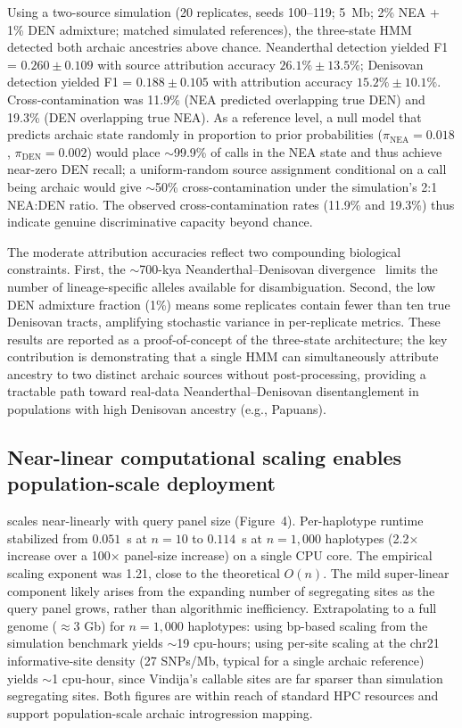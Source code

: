 Using a two-source simulation (20 replicates, seeds 100--119; 5~Mb;
2\% NEA + 1\% DEN admixture; matched simulated references),
the three-state \AP{} HMM detected both archaic ancestries above chance.
Neanderthal detection yielded F1 = $0.260 \pm 0.109$ with source attribution
accuracy $26.1\% \pm 13.5\%$; Denisovan detection yielded F1 = $0.188 \pm 0.105$
with attribution accuracy $15.2\% \pm 10.1\%$.
Cross-contamination was 11.9\% (NEA predicted overlapping true DEN)
and 19.3\% (DEN overlapping true NEA).
As a reference level, a null model that predicts archaic state randomly
in proportion to prior probabilities ($\pi_\mathrm{NEA} = 0.018$,
$\pi_\mathrm{DEN} = 0.002$) would place $\sim$99.9\% of calls in the NEA
state and thus achieve near-zero DEN recall; a uniform-random source
assignment conditional on a call being archaic would give $\sim$50\%
cross-contamination under the simulation's 2:1 NEA:DEN ratio.
The observed cross-contamination rates (11.9\% and 19.3\%) thus indicate
genuine discriminative capacity beyond chance.

The moderate attribution accuracies reflect two compounding biological constraints.
First, the $\sim$700-kya Neanderthal--Denisovan
divergence~\citep{prufer2014complete} limits the number of lineage-specific
alleles available for disambiguation.
Second, the low DEN admixture fraction (1\%) means some replicates contain
fewer than ten true Denisovan tracts, amplifying stochastic variance in per-replicate metrics.
These results are reported as a proof-of-concept of the three-state architecture;
the key contribution is demonstrating that a single HMM can simultaneously
attribute ancestry to two distinct archaic sources without post-processing,
providing a tractable path toward real-data Neanderthal--Denisovan disentanglement
in populations with high Denisovan ancestry (e.g., Papuans).

\subsection*{Near-linear computational scaling enables population-scale deployment}

\AP{} scales near-linearly with query panel size (Figure~4).
Per-haplotype runtime stabilized from $0.051$~s at $n = 10$ to $0.114$~s
at $n = 1{,}000$ haplotypes (2.2$\times$ increase over a 100$\times$ panel-size increase)
on a single CPU core.
The empirical scaling exponent was 1.21, close to the theoretical $O(n)$.
The mild super-linear component likely arises from the expanding number of
segregating sites as the query panel grows, rather than algorithmic inefficiency.
Extrapolating to a full genome ($\approx$3 Gb) for $n = 1{,}000$ haplotypes:
using bp-based scaling from the simulation benchmark yields $\sim$19 cpu-hours;
using per-site scaling at the chr21 informative-site density (27 SNPs/Mb, typical
for a single archaic reference) yields $\sim$1 cpu-hour, since Vindija's callable
sites are far sparser than simulation segregating sites.
Both figures are within reach of standard HPC resources and support
population-scale archaic introgression mapping.

